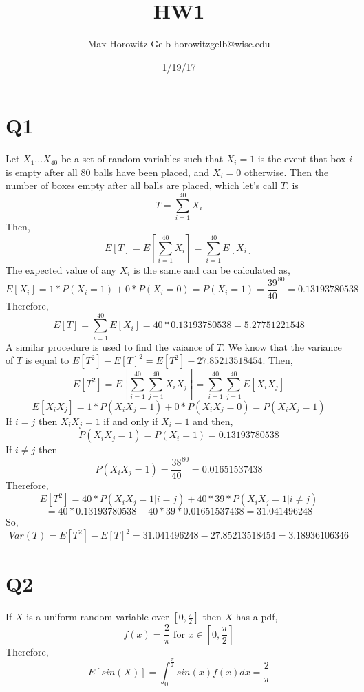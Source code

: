 \documentclass{article}
\title{HW1}
\author{Max Horowitz-Gelb horowitzgelb@wisc.edu}
\date{1/19/17}
\begin{document}
\maketitle
\section*{Q1}
Let $X_1 ... X_{40}$ be a set of random variables such that $X_i = 1$ is the event that box $i$ is empty
after all $80$ balls have been placed, and $X_i = 0$ otherwise.
Then the number of boxes empty after all balls are placed, which let's call $T$, is 
\[
T = \sum_{i=1}^{40} X_i
\]
Then,
\[
E[T] = E[\sum_{i=1}^{40} X_i] = \sum_{i=1}^{40} E[X_i]
\]
The expected value of any $X_i$ is the same and can be calculated as,
\[
E[X_i] = 1*P(X_i = 1) + 0 * P(X_i = 0) = P(X_i = 1) = \frac{39}{40}^{80} = 0.13193780538
\]
Therefore,
\[
E[T] = \sum_{i=1}^{40} E[X_i] = 40 * 0.13193780538 = 5.27751221548
\]
A similar procedure is used to find the vaiance of $T$.
We know that the variance of $T$ is equal to $E[T^2] - E[T]^2 = E[T^2] - 27.85213518454$.
Then,
\[
E[T^2] = E[ \sum_{i=1}^{40}\sum_{j=1}^{40}X_i X_j] = \sum_{i=1}^{40}\sum_{j=1}^{40}E[X_i X_j]
\]
\[
E[X_iX_j] = 1 * P(X_iX_j = 1) + 0 * P(X_iX_j = 0) = P(X_iX_j = 1)
\]
If $i = j$ then $X_iX_j = 1$ if and only if $X_i = 1$ and then,
\[
P(X_iX_j = 1) = P(X_i = 1) = 0.13193780538
\]
If $i \neq j$ then
\[
P(X_iX_j = 1) = \frac{38}{40}^{80} = 0.01651537438
\]
Therefore, 
\[
E[T^2] = 40 * P(X_iX_j = 1 | i = j) + 40*39 * P(X_iX_j=1|i\neq j) 
\]
\[
= 40 * 0.13193780538 + 40*39*0.01651537438 = 31.041496248
\]
So,
\[
Var(T) = E[T^2] - E[T]^2 = 31.041496248 - 27.85213518454 = 3.18936106346
\]
\section*{Q2}
If $X$ is a uniform random variable over $[0,\frac{\pi}{2}]$ then $X$ has a pdf,
\[
f(x) = \frac{2}{\pi} \text{ for } x \in [0,\frac{\pi}{2}]
\]
Therefore,
\[
E[sin(X)] = \int_{0}^{\frac{\pi}{2}} sin(x)f(x)dx = \frac{2}{\pi}
\]
\end{document}

